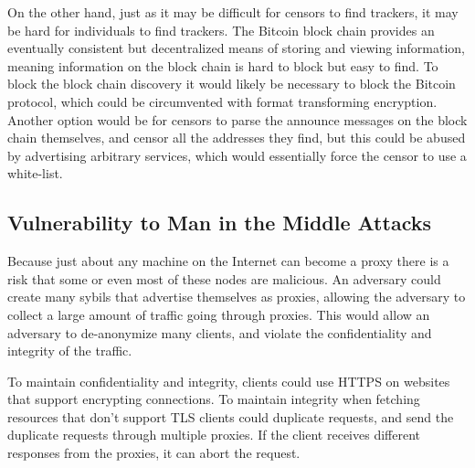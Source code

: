 On the other hand, just as it may be difficult for censors to find trackers, it may be hard for individuals to find trackers. The Bitcoin block chain provides an eventually consistent but decentralized means of storing and viewing information, meaning information on the block chain is hard to block but easy to find. To block the block chain discovery it would likely be necessary to block the Bitcoin protocol, which could be circumvented with format transforming encryption. Another option would be for censors to parse the announce messages on the block chain themselves, and censor all the addresses they find, but this could be abused by advertising arbitrary services, which would essentially force the censor to use a white-list.

\subsection{Vulnerability to Man in the Middle Attacks}
\label{sec:mitm}

Because just about any machine on the Internet can become a proxy there is a risk that some or even most of these nodes are malicious. An adversary could create many sybils that advertise themselves as proxies, allowing the adversary to collect a large amount of traffic going through proxies. This would allow an adversary to de-anonymize many clients, and violate the confidentiality and integrity of the traffic.

To maintain confidentiality and integrity, clients could use HTTPS on websites that support encrypting connections. To maintain integrity when fetching resources that don't support TLS clients could duplicate requests, and send the duplicate requests through multiple proxies. If the client receives different responses from the proxies, it can abort the request.

